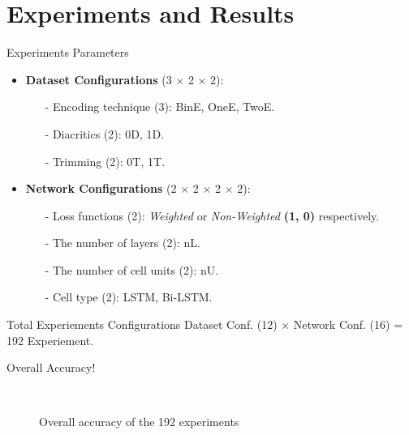 
%	


\section{Experiments and Results}

\begin{frame}[fragile]{Experiments Parameters}
\begin{itemize}
	\item \textbf{Dataset Configurations} (3 $\times$ 2 $\times$ 2):
	\begin{itemize}
		\item [-] Encoding technique (3): BinE, OneE, TwoE.
		\item [-] Diacritics (2): 0D, 1D.
		\item [-] Trimming (2): 0T, 1T.
	\end{itemize}
\item \textbf{Network Configurations} (2 $\times$ 2 $\times$ 2 $\times$ 2):
\begin{itemize}
\item [-] Loss functions (2): \textit{Weighted} or \textit{Non-Weighted } \textbf{(1, 0)} respectively.
\item [-] The number of layers (2): nL.
\item [-] The number of cell units (2): nU.
\item [-] Cell type (2): LSTM, Bi-LSTM.
\end{itemize}
\end{itemize}
\begin{block}{Total Experiements Configurations}
	Dataset Conf. (12) $\times$ Network Conf. (16) = 192 Experiement.
\end{block}
\end{frame}
\begin{frame}[fragile]{Overall Accuracy!}


\begin{figure}[!t]
	
	\caption{Overall accuracy of the 192 experiments}~\label{Fig:ArabicModelsResults}
\end{figure}

\end{frame}


